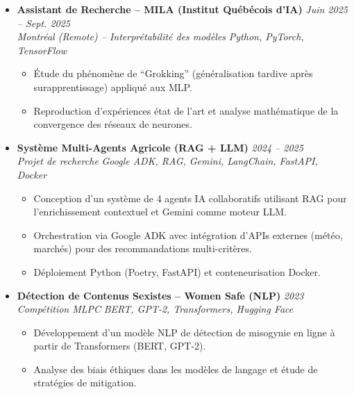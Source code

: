 \documentclass[a4paper,11pt]{article}
\begin{document}
\begin{itemize}[leftmargin=*, label={-}]
\item \textbf{Assistant de Recherche -- MILA (Institut Québécois d'IA)} \hfill \textit{Juin 2025 -- Sept. 2025} \\
\textit{Montréal (Remote) -- Interprétabilité des modèles} \hfill \textit{Python, PyTorch, TensorFlow}
\vspace{-2pt}
    \begin{itemize}[leftmargin=0.4cm, nosep, label=\tiny$\bullet$]
        \item \small{Étude du phénomène de ``Grokking'' (généralisation tardive après surapprentissage) appliqué aux MLP.}
        \item \small{Reproduction d'expériences état de l'art et analyse mathématique de la convergence des réseaux de neurones.}
    \end{itemize}
\vspace{3pt}

\item \textbf{Système Multi-Agents Agricole (RAG + LLM)} \hfill \textit{2024 -- 2025} \\
\textit{Projet de recherche} \hfill \textit{Google ADK, RAG, Gemini, LangChain, FastAPI, Docker}
\vspace{-2pt}
    \begin{itemize}[leftmargin=0.4cm, nosep, label=\tiny$\bullet$]
        \item \small{Conception d'un système de 4 agents IA collaboratifs utilisant RAG pour l'enrichissement contextuel et Gemini comme moteur LLM.}
        \item \small{Orchestration via Google ADK avec intégration d'APIs externes (météo, marchés) pour des recommandations multi-critères.}
        \item \small{Déploiement Python (Poetry, FastAPI) et conteneurisation Docker.}
    \end{itemize}
\vspace{3pt}

\item \textbf{Détection de Contenus Sexistes -- Women Safe (NLP)} \hfill \textit{2023} \\
\textit{Compétition MLPC} \hfill \textit{BERT, GPT-2, Transformers, Hugging Face}
\vspace{-2pt}
    \begin{itemize}[leftmargin=0.4cm, nosep, label=\tiny$\bullet$]
        \item \small{Développement d'un modèle NLP de détection de misogynie en ligne à partir de Transformers (BERT, GPT-2).}
        \item \small{Analyse des biais éthiques dans les modèles de langage et étude de stratégies de mitigation.}
    \end{itemize}
\vspace{3pt}


\end{itemize}
\end{document}
